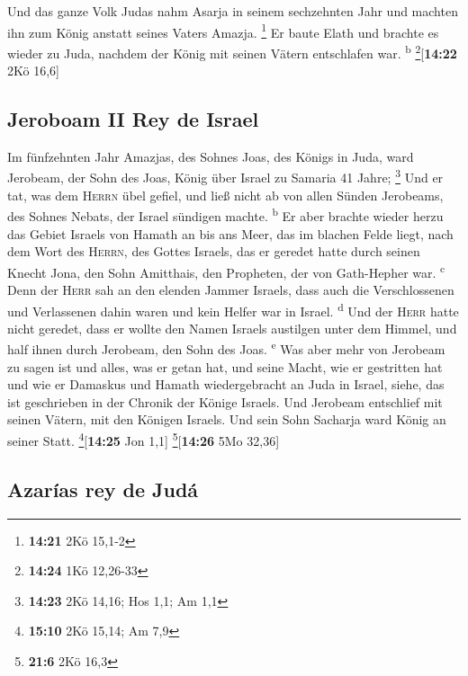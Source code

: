  Und das ganze Volk Judas nahm Asarja in seinem
sechzehnten Jahr und machten ihn zum König anstatt seines Vaters Amazja.
\footnote{\textbf{14:21} 2Kö 15,1-2}  Er baute Elath und
brachte es wieder zu Juda, nachdem der König mit seinen Vätern
entschlafen war. \textsuperscript{b} \footnote{\textbf{14:24} 1Kö
  12,26-33}{[}\textbf{14:22} 2Kö 16,6{]}

\hypertarget{jeroboam-ii-rey-de-israel}{%
\subsection{Jeroboam II Rey de Israel}\label{jeroboam-ii-rey-de-israel}}

 Im fünfzehnten Jahr Amazjas, des Sohnes Joas, des Königs
in Juda, ward Jerobeam, der Sohn des Joas, König über Israel zu Samaria
41 Jahre; \footnote{\textbf{14:23} 2Kö 14,16; Hos 1,1; Am 1,1}
 Und er tat, was dem \textsc{Herrn} übel gefiel, und ließ
nicht ab von allen Sünden Jerobeams, des Sohnes Nebats, der Israel
sündigen machte. \textsuperscript{b}  Er aber brachte
wieder herzu das Gebiet Israels von Hamath an bis ans Meer, das im
blachen Felde liegt, nach dem Wort des \textsc{Herrn}, des Gottes
Israels, das er geredet hatte durch seinen Knecht Jona, den Sohn
Amitthais, den Propheten, der von Gath-Hepher war. \textsuperscript{c}
 Denn der \textsc{Herr} sah an den elenden Jammer
Israels, dass auch die Verschlossenen und Verlassenen dahin waren und
kein Helfer war in Israel. \textsuperscript{d}  Und der
\textsc{Herr} hatte nicht geredet, dass er wollte den Namen Israels
austilgen unter dem Himmel, und half ihnen durch Jerobeam, den Sohn des
Joas. \textsuperscript{e}  Was aber mehr von Jerobeam zu
sagen ist und alles, was er getan hat, und seine Macht, wie er
gestritten hat und wie er Damaskus und Hamath wiedergebracht an Juda in
Israel, siehe, das ist geschrieben in der Chronik der Könige Israels.
 Und Jerobeam entschlief mit seinen Vätern, mit den
Königen Israels. Und sein Sohn Sacharja ward König an seiner Statt.
\footnote{\textbf{15:10} 2Kö 15,14; Am 7,9}{[}\textbf{14:25} Jon 1,1{]}
\footnote{\textbf{21:6} 2Kö 16,3}{[}\textbf{14:26} 5Mo 32,36{]}

\hypertarget{azaruxedas-rey-de-juduxe1}{%
\subsection{Azarías rey de Judá}\label{azaruxedas-rey-de-juduxe1}}

